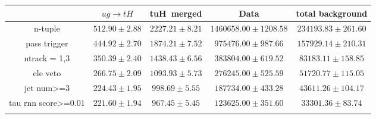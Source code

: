 \begin{tabular}{ccccc} \toprule\toprule
 & $ug\to tH$ & tuH~merged & Data & total background\\\midrule
n-tuple & $512.90\pm2.88$ & $2227.21\pm8.21$ & $1460658.00\pm1208.58$ & $234193.83\pm261.60$\\
pass trigger & $444.92\pm2.70$ & $1874.21\pm7.52$ & $975476.00\pm987.66$ & $157929.14\pm210.31$\\
ntrack = 1,3 & $350.39\pm2.40$ & $1438.43\pm6.56$ & $383804.00\pm619.52$ & $83183.11\pm158.85$\\
ele veto & $266.75\pm2.09$ & $1093.93\pm5.73$ & $276245.00\pm525.59$ & $51720.77\pm115.05$\\
jet num>=3 & $224.43\pm1.95$ & $998.69\pm5.55$ & $187734.00\pm433.28$ & $43611.26\pm104.17$\\
tau rnn score>=0.01 & $221.60\pm1.94$ & $967.45\pm5.45$ & $123625.00\pm351.60$ & $33301.36\pm83.74$\\
\bottomrule\bottomrule\\
\end{tabular}






